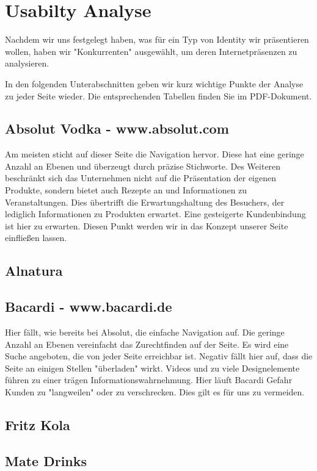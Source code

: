 \documentclass[12pt,a4paper,oneside,ngerman]{article}
\begin{document}
\newpage %
\section{Usabilty Analyse} %
Nachdem wir uns festgelegt haben, was für ein Typ von Identity wir präsentieren wollen, haben wir "Konkurrenten" ausgewählt, um deren Internetpräsenzen zu analysieren. 

In den folgenden Unterabschnitten geben wir kurz wichtige Punkte der Analyse zu jeder Seite wieder. Die entsprechenden Tabellen finden Sie im PDF-Dokument. %

\subsection{Absolut Vodka - www.absolut.com} %
Am meisten sticht auf dieser Seite die Navigation hervor. Diese hat eine geringe Anzahl an Ebenen und überzeugt durch präzise Stichworte. Des Weiteren beschränkt sich das Unternehmen nicht auf die Präsentation der eigenen Produkte, sondern bietet auch Rezepte an und Informationen zu Veranstaltungen. Dies übertrifft die Erwartungshaltung des Besuchers, der lediglich Informationen zu Produkten erwartet. Eine gesteigerte Kundenbindung ist hier zu erwarten. Diesen Punkt werden wir in das Konzept unserer Seite einfließen lassen.
\subsection{Alnatura} %

\subsection{Bacardi - www.bacardi.de} %
Hier fällt, wie bereits bei Absolut, die einfache Navigation auf. Die geringe Anzahl an Ebenen vereinfacht das Zurechtfinden auf der Seite. Es wird eine Suche angeboten, die von jeder Seite erreichbar ist. Negativ fällt hier auf, dass die Seite an einigen Stellen "überladen" wirkt. Videos und zu viele Designelemente führen zu einer trägen Informationswahrnehmung. Hier läuft Bacardi Gefahr Kunden zu "langweilen" oder zu verschrecken. Dies gilt es für uns zu vermeiden.
\subsection{Fritz Kola} %

\subsection{Mate Drinks} %
\end{document}
